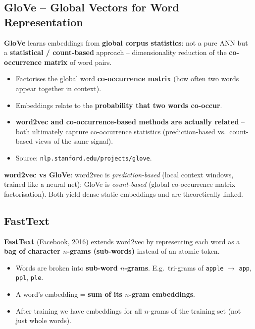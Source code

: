 \documentclass[10pt,a4paper]{article}
\begin{document}
	\subsection{GloVe -- Global Vectors for Word Representation}

	\begin{definitionbox}
		\textbf{GloVe} learns embeddings from \textbf{global corpus statistics}: not a pure ANN but a \textbf{statistical / count-based} approach -- dimensionality reduction of the \textbf{co-occurrence matrix} of word pairs.
	\end{definitionbox}

	\begin{itemize}[leftmargin=*]
		\item Factorises the global word \textbf{co-occurrence matrix} (how often two words appear together in context).
		\item Embeddings relate to the \textbf{probability that two words co-occur}.
		\item \textbf{word2vec and co-occurrence-based methods are actually related} -- both ultimately capture co-occurrence statistics (prediction-based vs.\ count-based views of the same signal).
		\item Source: \texttt{nlp.stanford.edu/projects/glove}.
	\end{itemize}

	\begin{examtipbox}
		\textbf{word2vec vs GloVe}: word2vec is \emph{prediction-based} (local context windows, trained like a neural net); GloVe is \emph{count-based} (global co-occurrence matrix factorisation). Both yield dense static embeddings and are theoretically linked.
	\end{examtipbox}

	\subsection{FastText}

	\begin{definitionbox}
		\textbf{FastText} (Facebook, 2016) extends word2vec by representing each word as a \textbf{bag of character $n$-grams (sub-words)} instead of an atomic token.
	\end{definitionbox}

	\begin{itemize}[leftmargin=*]
		\item Words are broken into \textbf{sub-word $n$-grams}. E.g.\ tri-grams of \texttt{apple} $\to$ \texttt{app}, \texttt{ppl}, \texttt{ple}.
		\item A word's embedding = \textbf{sum of its $n$-gram embeddings}.
		\item After training we have embeddings for all $n$-grams of the training set (not just whole words).
	\end{itemize}
\end{document}
